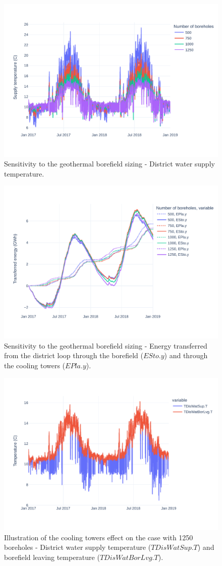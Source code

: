 \begin{figure}[!htbp]
\centering
\includegraphics[width=.7\linewidth]{../python_scripts/figures/GeoSizing.pdf}
\caption{Sensitivity to the geothermal borefield sizing - District water supply temperature.}
\label{fig:geo_sizing}
\end{figure}

\begin{figure}[!htbp]
\centering
\includegraphics[width=.7\linewidth]{../python_scripts/figures/GeoSizingE.pdf}
\caption{Sensitivity to the geothermal borefield sizing - Energy transferred from the district loop through the borefield ($ESto.y$) and through the cooling towers ($EPla.y$).}
\label{fig:geo_cooling}
\end{figure}


\begin{figure}[!htbp]
\centering
\includegraphics[width=.7\linewidth]{../python_scripts/figures/GeoBestCaseT.pdf}
\caption{Illustration of the cooling towers effect on the case with 1250 boreholes - District water supply temperature ($TDisWatSup.T$) and borefield leaving temperature ($TDisWatBorLvg.T$).}
\label{fig:coolingeffect}
\end{figure}


